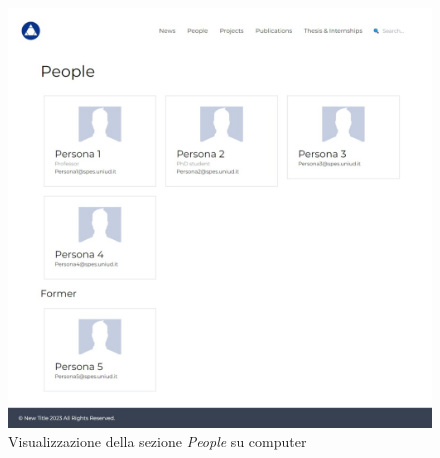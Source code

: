 \documentclass[target=bach,aauheader=]{thud}
\begin{document}
\begin{figure}
    \begin{minipage}{0.5\textwidth}
      \centering
      \includegraphics[width=1.2\textwidth]{images/people-computer.png}
      \caption{Visualizzazione della sezione \textit{People} su computer}
      \label{img:computerp}
    \end{minipage}
    \begin{minipage}{0.5\textwidth}
      \centering

\end{minipage}
\end{figure}
\end{document}
